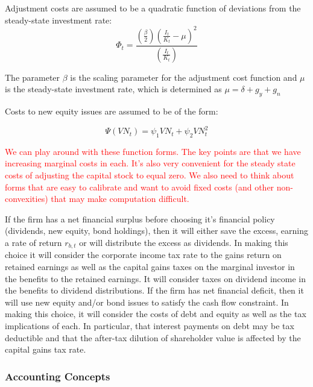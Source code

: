 Adjustment costs are assumed to be a quadratic function of deviations from the steady-state investment rate:
\begin{equation}
\label{eqn:adj_cost}
\Phi_{t}=\frac{\left(\frac{\beta}{2}\right)\left(\frac{I_{t}}{K_{t}}-\mu\right)^{2}}{\left(\frac{I_{t}}{K_{t}}\right)}
\end{equation}

\noindent\noindent The parameter $\beta$ is the scaling parameter for the adjustment cost function and $\mu$ is the steady-state investment rate, which is determined as $\mu=\delta+g_{y}+g_{n}$

Costs to new equity issues are assumed to be of the form:

\begin{equation}
\label{eqn:equity_cost}
\Psi(VN_{t})= \psi_{1}VN_{t} + \psi_{2}VN_{t}^{2}
\end{equation}

\textcolor{red}{We can play around with these function forms.  The key points are that we have increasing marginal costs in each. It's also very convenient for the steady state costs of adjusting the capital stock to equal zero.  We also need to think about forms that are easy to calibrate and want to avoid fixed costs (and other non-convexities) that may make computation difficult.}

If the firm has a net financial surplus before choosing it's financial policy (dividends, new equity, bond holdings), then it will either save the excess, earning a rate of return $r_{b,t}$ or will distribute the excess as dividends.  In making this choice it will consider the corporate income tax rate to the gains return on retained earnings as well as the capital gains taxes on the marginal investor in the benefits to the retained earnings.  It will consider taxes on dividend income in the benefits to dividend distributions.  If the firm has net financial deficit, then it will use new equity and/or bond issues to satisfy the cash flow constraint. In making this choice, it will consider the costs of debt and equity as well as the tax implications of each.  In particular, that interest payments on debt may be tax deductible and that the after-tax dilution of shareholder value is affected by the capital gains tax rate.



\subsubsection{Accounting Concepts}

